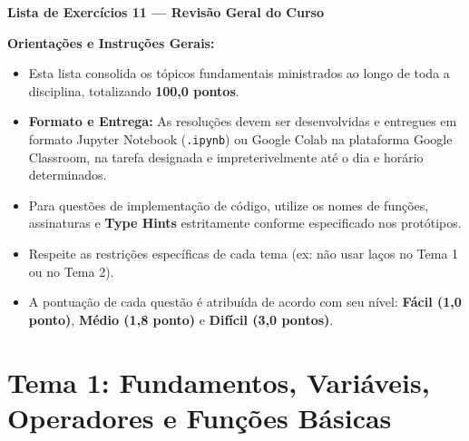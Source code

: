 \vspace{1cm}

\noindent \textbf{\Large Lista de Exercícios 11 — Revisão Geral do Curso}

\vspace{0.3cm}
\noindent \textbf{Orientações e Instruções Gerais:}
\begin{itemize}[leftmargin=*]
    \item Esta lista consolida os tópicos fundamentais ministrados ao longo de toda a disciplina, totalizando \textbf{100,0 pontos}.
    \item \textbf{Formato e Entrega:} As resoluções devem ser desenvolvidas e entregues em formato Jupyter Notebook (\texttt{.ipynb}) ou Google Colab na plataforma Google Classroom, na tarefa designada e impreterivelmente até o dia e horário determinados.
    \item Para questões de implementação de código, utilize os nomes de funções, assinaturas e \textbf{Type Hints} estritamente conforme especificado nos protótipos.
    \item Respeite as restrições específicas de cada tema (ex: não usar laços no Tema 1 ou no Tema 2).
    \item A pontuação de cada questão é atribuída de acordo com seu nível: \textbf{Fácil (1,0 ponto)}, \textbf{Médio (1,8 ponto)} e \textbf{Difícil (3,0 pontos)}.
\end{itemize}

\vspace{0.5cm}


\section*{Tema 1: Fundamentos, Variáveis, Operadores e Funções Básicas}

